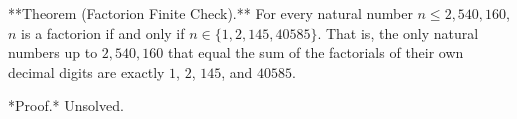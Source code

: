 
**Theorem (Factorion Finite Check).** For every natural number $n \leq 2{,}540{,}160$, $n$ is a factorion if and only if $n \in \{1, 2, 145, 40585\}$. That is, the only natural numbers up to $2{,}540{,}160$ that equal the sum of the factorials of their own decimal digits are exactly $1$, $2$, $145$, and $40585$.

*Proof.* Unsolved.
